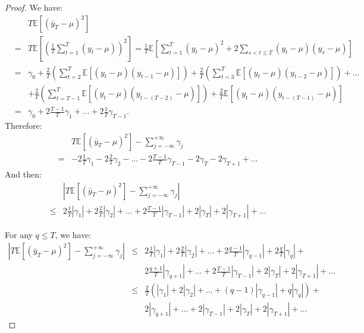 \documentclass[
  12pt,
]{book}
\theoremstyle{definition}
\theoremstyle{definition}
\theoremstyle{definition}
\theoremstyle{definition}
\theoremstyle{remark}
\begin{document}
\begin{proof}
We have:
\begin{eqnarray*}
&&T\mathbb{E}\left[(\bar{y}_T - \mu)^2\right]\\
&=& T\mathbb{E}\left[\left(\frac{1}{T}\sum_{t=1}^T(y_t - \mu)\right)^2\right] = \frac{1}{T} \mathbb{E}\left[\sum_{t=1}^T(y_t - \mu)^2+2\sum_{s<t\le T}(y_t - \mu)(y_s - \mu)\right]\\
&=& \gamma_0 +\frac{2}{T}\left(\sum_{t=2}^{T}\mathbb{E}\left[(y_t - \mu)(y_{t-1} - \mu)\right]\right) +\frac{2}{T}\left(\sum_{t=3}^{T}\mathbb{E}\left[(y_t - \mu)(y_{t-2} - \mu)\right]\right) + \dots \\
&&+ \frac{2}{T}\left(\sum_{t=T-1}^{T}\mathbb{E}\left[(y_t - \mu)(y_{t-(T-2)} - \mu)\right]\right) + \frac{2}{T}\mathbb{E}\left[(y_t - \mu)(y_{t-(T-1)} - \mu)\right]\\
&=&  \gamma_0 + 2 \frac{T-1}{T}\gamma_1 + \dots + 2 \frac{1}{T}\gamma_{T-1} .
\end{eqnarray*}
Therefore:
\begin{eqnarray*}
&& T\mathbb{E}\left[(\bar{y}_T - \mu)^2\right] - \sum_{j=-\infty}^{+\infty} \gamma_j \\
&=& - 2\frac{1}{T}\gamma_1 - 2\frac{2}{T}\gamma_2 - \dots - 2\frac{T-1}{T}\gamma_{T-1} - 2\gamma_T - 2 \gamma_{T+1} + \dots
\end{eqnarray*}
And then:
\begin{eqnarray*}
&& \left|T\mathbb{E}\left[(\bar{y}_T - \mu)^2\right] - \sum_{j=-\infty}^{+\infty} \gamma_j\right|\\
&\le& 2\frac{1}{T}|\gamma_1| + 2\frac{2}{T}|\gamma_2| + \dots + 2\frac{T-1}{T}|\gamma_{T-1}| + 2|\gamma_T| + 2 |\gamma_{T+1}| + \dots
\end{eqnarray*}

For any \(q \le T\), we have:
\begin{eqnarray*}
\left|T\mathbb{E}\left[(\bar{y}_T - \mu)^2\right] - \sum_{j=-\infty}^{+\infty} \gamma_j\right| &\le& 2\frac{1}{T}|\gamma_1| + 2\frac{2}{T}|\gamma_2| + \dots + 2\frac{q-1}{T}|\gamma_{q-1}| +2\frac{q}{T}|\gamma_q| +\\
&&2\frac{q+1}{T}|\gamma_{q+1}| + \dots  + 2\frac{T-1}{T}|\gamma_{T-1}| + 2|\gamma_T| + 2 |\gamma_{T+1}| + \dots\\
&\le& \frac{2}{T}\left(|\gamma_1| + 2|\gamma_2| + \dots + (q-1)|\gamma_{q-1}| +q|\gamma_q|\right) +\\
&&2|\gamma_{q+1}| + \dots  + 2|\gamma_{T-1}| + 2|\gamma_T| + 2 |\gamma_{T+1}| + \dots
\end{eqnarray*}


\end{proof}
\end{document}
